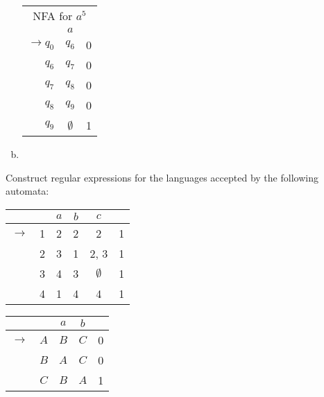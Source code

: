 \begin{solution}
\begin{enumerate}[(a)]
\begin{center}\begin{tabular}[t]{r| c r}
    \multicolumn{3}{c}{NFA for \(a^5\)}\\
    & \(a\) & \\\bottomrule
    \(\to q_0\) & \(q_6\) & 0\\
    \(q_6\) & \(q_7\) & 0\\
    \(q_7\) & \(q_8\) & 0\\
    \(q_8\) & \(q_9\) & 0\\
    \(q_9\) & \(\emptyset\) & 1              
\end{tabular}\end{center}
\item 
\end{enumerate}
\end{solution}
\begin{exercise}{4}
Construct regular expressions for the languages accepted by the following automata:
\begin{enumerate}[(a)]
\begin{multicols}{2}
    \item \begin{tabular}[t]{c c| c c c c}
         & & \(a\) & \(b\) & \(c\) & \\\bottomrule
         \(\to\) & 1 & 2 & 2 & 2 & 1\\
               & 2 & 3 & 1 & 2, 3 & 1\\
               & 3 & 4 & 3 & \(\emptyset\) & 1\\
               & 4 & 1 & 4 & 4 & 1
    \end{tabular}
    \item \begin{tabular}[t]{c c| c c c}
         & & \(a\) & \(b\) & \\\bottomrule
         \(\to\) & \(A\) & \(B\) & \(C\) & 0\\
               & \(B\) & \(A\) & \(C\) & 0\\
               & \(C\) & \(B\) & \(A\) & 1 
    \end{tabular}
\end{multicols}
\end{enumerate}
\end{exercise}

